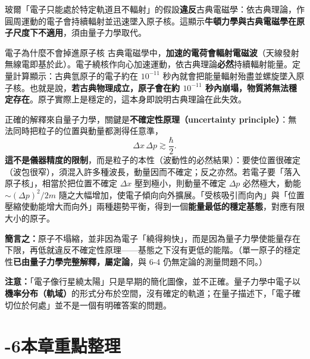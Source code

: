 \documentclass[11pt]{article}
\begin{document}

玻爾「電子只能處於特定軌道且不輻射」的假設\textbf{違反}古典電磁學：依古典理論，作圓周運動的電子會持續輻射並迅速墜入原子核。這顯示\textbf{牛頓力學與古典電磁學在原子尺度下不適用}，須由量子力學取代。

\begin{延伸框}{電子為什麼不會掉進原子核}
古典電磁學中，\textbf{加速的電荷會輻射電磁波}（天線發射無線電即基於此）。電子繞核作向心加速運動，依古典理論\textbf{必然}持續輻射能量。定量計算顯示：古典氫原子的電子約在 $10^{-11}$ 秒內就會把能量輻射殆盡並螺旋墜入原子核。也就是說，\textbf{若古典物理成立，原子會在約 $10^{-11}$ 秒內崩塌，物質將無法穩定存在}。原子實際上是穩定的，這本身即說明古典理論在此失效。

正確的解釋來自量子力學，關鍵是\textbf{不確定性原理（uncertainty principle）}：無法同時把粒子的位置與動量都測得任意準，
$$\Delta x\,\Delta p \gtrsim \frac{\hbar}{2}.$$
\textbf{這不是儀器精度的限制}，而是粒子的本性（波動性的必然結果）：要使位置很確定（波包很窄），須混入許多種波長，動量因而不確定；反之亦然。若電子要「落入原子核」，相當於把位置不確定 $\Delta x$ 壓到極小，則動量不確定 $\Delta p$ 必然極大，動能 $\sim(\Delta p)^2/2m$ 隨之大幅增加，使電子傾向向外擴展。「受核吸引而向內」與「位置壓縮使動能增大而向外」兩種趨勢平衡，得到一個\textbf{能量最低的穩定基態}，對應有限大小的原子。

\textbf{簡言之：}原子不塌縮，並非因為電子「繞得夠快」，而是因為量子力學使能量存在下限，再低就違反不確定性原理——基態之下沒有更低的能階。（單一原子的穩定性\textbf{已由量子力學完整解釋，屬定論}，與 6-4 仍無定論的測量問題不同。）

\textbf{注意：}「電子像行星繞太陽」只是早期的簡化圖像，並不正確。量子力學中電子以\textbf{機率分布（軌域）}的形式分布於空間，沒有確定的軌道；在量子描述下，「電子確切位於何處」並不是一個有明確答案的問題。
\end{延伸框}

\section*{-6\quad 本章重點整理}
\end{document}

